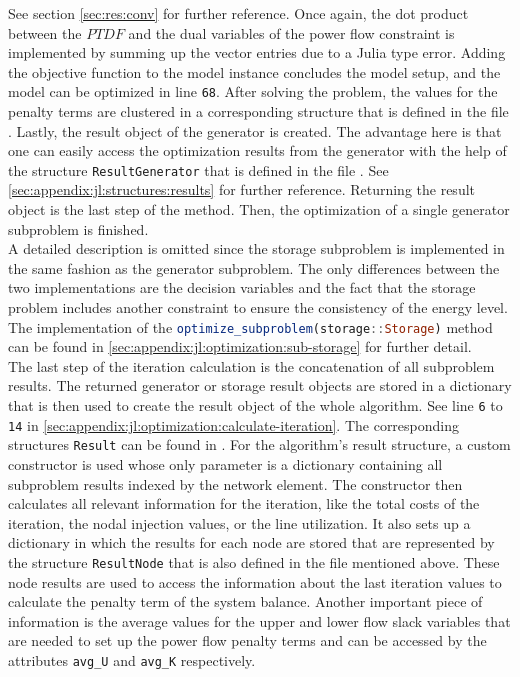 See section \ref{sec:res:conv} for further reference. Once again, the dot product between the $PTDF$ and the dual variables of the power flow constraint is implemented by summing up the vector entries due to a Julia type error. Adding the objective function to the model instance concludes the model setup, and the model can be optimized in line \texttt{68}. After solving the problem, the values for the penalty terms are clustered in a corresponding structure that is defined in the file . Lastly, the result object of the generator is created. The advantage here is that one can easily access the optimization results from the generator with the help of the structure \lstinline[language=julia]{ResultGenerator} that is defined in the file . See \ref{sec:appendix:jl:structures:results} for further reference. Returning the result object is the last step of the method. Then, the optimization of a single generator subproblem is finished.\\

A detailed description is omitted since the storage subproblem is implemented in the same fashion as the generator subproblem. The only differences between the two implementations are the decision variables and the fact that the storage problem includes another constraint to ensure the consistency of the energy level. The implementation of the \lstinline[language=julia]{optimize_subproblem(storage::Storage)} method can be found in \ref{sec:appendix:jl:optimization:sub-storage} for further detail.\\

The last step of the iteration calculation is the concatenation of all subproblem results. The returned generator or storage result objects are stored in a dictionary that is then used to create the result object of the whole algorithm. See line \texttt{6} to \texttt{14} in \ref{sec:appendix:jl:optimization:calculate-iteration}. The corresponding structures \lstinline[language=julia]{Result} can be found in . For the algorithm's result structure, a custom constructor is used whose only parameter is a dictionary containing all subproblem results indexed by the network element. The constructor then calculates all relevant information for the iteration, like the total costs of the iteration, the nodal injection values, or the line utilization. It also sets up a dictionary in which the results for each node are stored that are represented by the structure \lstinline[language=julia]{ResultNode} that is also defined in the file mentioned above. These node results are used to access the information about the last iteration values to calculate the penalty term of the system balance. Another important piece of information is the average values for the upper and lower flow slack variables that are needed to set up the power flow penalty terms and can be accessed by the attributes \lstinline[language=julia]{avg_U} and \lstinline[language=julia]{avg_K} respectively.

